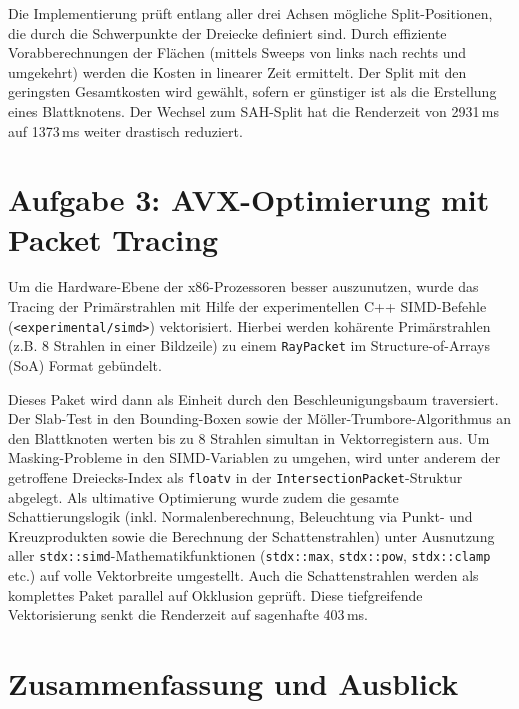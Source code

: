 \documentclass[11pt, a4paper]{article}
\begin{document}
Die Implementierung prüft entlang aller drei Achsen mögliche Split-Positionen, die durch die Schwerpunkte der Dreiecke definiert sind. Durch effiziente Vorabberechnungen der Flächen (mittels Sweeps von links nach rechts und umgekehrt) werden die Kosten in linearer Zeit ermittelt. Der Split mit den geringsten Gesamtkosten wird gewählt, sofern er günstiger ist als die Erstellung eines Blattknotens. Der Wechsel zum SAH-Split hat die Renderzeit von 2931\,ms auf 1373\,ms weiter drastisch reduziert.

\section{Aufgabe 3: AVX-Optimierung mit Packet Tracing}

Um die Hardware-Ebene der x86-Prozessoren besser auszunutzen, wurde das Tracing der Primärstrahlen mit Hilfe der experimentellen C++ SIMD-Befehle (\texttt{<experimental/simd>}) vektorisiert. Hierbei werden kohärente Primärstrahlen (z.B. 8 Strahlen in einer Bildzeile) zu einem \texttt{RayPacket} im Structure-of-Arrays (SoA) Format gebündelt. 

Dieses Paket wird dann als Einheit durch den Beschleunigungsbaum traversiert. Der Slab-Test in den Bounding-Boxen sowie der Möller-Trumbore-Algorithmus an den Blattknoten werten bis zu 8 Strahlen simultan in Vektorregistern aus. Um Masking-Probleme in den SIMD-Variablen zu umgehen, wird unter anderem der getroffene Dreiecks-Index als \texttt{floatv} in der \texttt{IntersectionPacket}-Struktur abgelegt. Als ultimative Optimierung wurde zudem die gesamte Schattierungslogik (inkl. Normalenberechnung, Beleuchtung via Punkt- und Kreuzprodukten sowie die Berechnung der Schattenstrahlen) unter Ausnutzung aller \texttt{stdx::simd}-Mathematikfunktionen (\texttt{stdx::max}, \texttt{stdx::pow}, \texttt{stdx::clamp} etc.) auf volle Vektorbreite umgestellt. Auch die Schattenstrahlen werden als komplettes Paket parallel auf Okklusion geprüft. Diese tiefgreifende Vektorisierung senkt die Renderzeit auf sagenhafte 403\,ms.

\section{Zusammenfassung und Ausblick}
\end{document}
